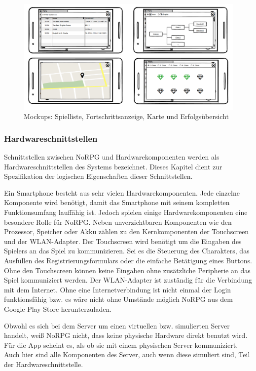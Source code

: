 			\begin{figure}[htbp]
				\centering 
				\label{mockupFenster}
				\includegraphics[width=\textwidth]{pics/NewWindows.png}
				\caption{Mockups: Spielliste, Fortschrittsanzeige, Karte und Erfolgsübersicht}
			\end{figure}
		
		\subsubsection{Hardwareschnittstellen}
			Schnittstellen zwischen NoRPG und Hardwarekomponenten werden als Hardwareschnittstellen des Systems bezeichnet. Dieses Kapitel dient zur Spezifikation der logischen Eigenschaften dieser Schnittstellen.
			
			Ein Smartphone besteht aus sehr vielen Hardwarekomponenten. Jede einzelne Komponente wird benötigt, damit das Smartphone mit seinem kompletten Funktionsumfang lauffähig ist. Jedoch spielen einige Hardwarekomponenten eine besondere Rolle für NoRPG. Neben unverzichtbaren Komponenten wie den Prozessor, Speicher oder Akku zählen zu den Kernkomponenten der Touchscreen und der WLAN-Adapter. Der Touchscreen wird benötigt um die Eingaben des Spielers an das Spiel zu kommunizieren. Sei es die Steuerung des Charakters, das Ausfüllen des Registrierungsformulars oder die einfache Betätigung eines Buttons. Ohne den Touchscreen können keine Eingaben ohne zusätzliche Peripherie an das Spiel kommuniziert werden. Der WLAN-Adapter ist zuständig für die Verbindung mit dem Internet. Ohne eine Internetverbindung ist nicht einmal der Login funktionsfähig bzw. es wäre nicht ohne Umstände möglich NoRPG aus dem Google Play Store herunterzuladen.
			
			Obwohl es sich bei dem Server um einen virtuellen bzw. simulierten Server handelt, weiß NoRPG nicht, dass keine physische Hardware direkt benutzt wird. Für die App scheint es, als ob sie mit einem physischen Server kommuniziert. Auch hier sind alle Komponenten des Server, auch wenn diese simuliert sind, Teil der Hardwareschnittstelle.
			
